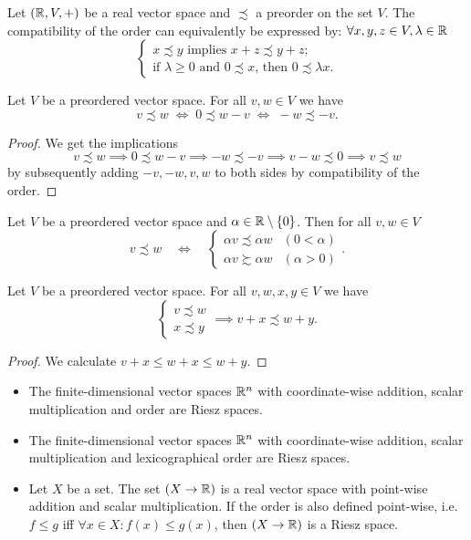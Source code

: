 \begin{lemma} \label{positiveConeOrderCharacterisation}
Let $\left( \mathbb{R}, V, + \right)$ be a real vector space and $\precsim$ a preorder on the set $V$. The compatibility of the order can equivalently be expressed by:
$\forall x,y,z\in V, \lambda\in\mathbb{R}$
\[ \begin{cases}
\text{$x \precsim y$ implies $x+z \precsim y+z$;} \\
\text{if $\lambda\geq 0$ and $0 \precsim x$, then $0 \precsim \lambda x$.}
\end{cases} \]
\end{lemma}

\begin{lemma} \label{elementaryVectorPreorderManipulations}
Let $V$ be a preordered vector space. For all $v,w \in V$ we have
\[ v \precsim w \;\iff\; 0 \precsim  w - v \;\iff\; -w \precsim -v.  \]
\end{lemma}
\begin{proof}
We get the implications
\[ v \precsim w \implies 0 \precsim  w - v \implies -w \precsim -v \implies v-w \precsim 0 \implies v\precsim w \]
by subsequently adding $-v, -w, v,w$ to both sides by compatibility of the order.
\end{proof}
\begin{corollary}
Let $V$ be a preordered vector space and $\alpha \in \mathbb{R}\setminus\{0\}$. Then for all $v,w\in V$
\[ v \precsim w \quad \iff \quad \begin{cases}
\alpha v \precsim \alpha w & (0 < \alpha) \\
\alpha v \succsim \alpha w & (\alpha > 0)
\end{cases}. \] 
\end{corollary}

\begin{lemma} \label{additionVectorInequalities}
Let $V$ be a preordered vector space. For all $v,w, x, y \in V$ we have
\[ \begin{cases}
v \precsim w \\ x \precsim y
\end{cases} \implies v+ x \precsim w+y. \]
\end{lemma}
\begin{proof}
We calculate $v + x \leq w + x \leq w+y$.
\end{proof}

\begin{example}
\begin{itemize}
\item The finite-dimensional vector spaces $\mathbb{R}^n$ with coordinate-wise addition, scalar multiplication and order are Riesz spaces.
\item The finite-dimensional vector spaces $\mathbb{R}^n$ with coordinate-wise addition, scalar multiplication and lexicographical order are Riesz spaces.
\item Let $X$ be a set. The set $(X\to \mathbb{R})$ is a real vector space with point-wise addition and scalar multiplication. If the order is also defined point-wise, i.e.\ $f \leq g$ iff $\forall x\in X: f(x) \leq g(x)$, then $(X\to \mathbb{R})$ is a Riesz space.
\end{itemize}
\end{example}

